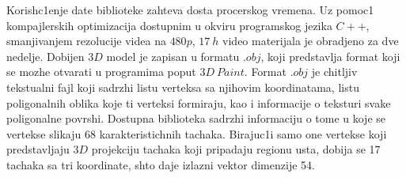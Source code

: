 \documentclass[a4paper, openany, oneside, 11pt]{book}
\begin{document}
Korish\-c1enje date biblioteke zahteva dosta procerskog vremena. Uz pomoc1 kompajlerskih optimizacija dostupnim u okviru programskog jezika $C++$, smanjivanjem rezolucije videa na $480p$, $\SI{17}{h}$ video materijala je obradjeno za dve nedelje. Dobijen $3D$ model je zapisan u formatu $.obj$, koji predstavlja format koji se mozhe otvarati u programima poput $3D\ Paint$. Format $.obj$ je chitljiv tekstualni fajl \cite{obj} koji sadrzhi listu verteksa sa njihovim koordinatama, listu poligonalnih oblika koje ti verteksi formiraju, kao i informacije o teksturi svake poligonalne povrshi. Dostupna biblioteka sadrzhi informaciju o tome u koje se vertekse slikaju 68 karakteristichnih tachaka. Birajuc1i samo one vertekse koji predstavljaju $3D$ projekciju tachaka koji pripadaju regionu usta, dobija se 17 tachaka sa tri koordinate, shto daje izlazni vektor dimenzije 54.
\begin{table}[!h]
	\begin{center}
	\end{center}
\caption{Mapiranje karakteristichnih tachaka usta na $3D$ model}
\label{tab:3_1}
\end{table}
\end{document}
